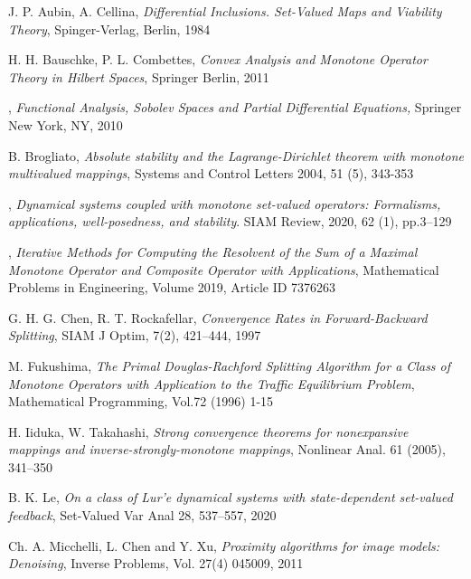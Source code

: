 \documentclass[11pt]{article}
\theoremstyle{plain}
\begin{document}
{\begin{thebibliography}{}
 {\sc J. P. Aubin, A. Cellina}, {\it Differential Inclusions. Set-Valued Maps and Viability Theory}, Spinger-Verlag, Berlin, 1984

   {\sc H. H. Bauschke, P. L. Combettes}, \textit{Convex Analysis and Monotone Operator
Theory in Hilbert Spaces}, Springer Berlin, 2011



, {\it Functional Analysis, Sobolev Spaces and Partial Differential Equations,} Springer New York, NY, 2010 

 { \sc B. Brogliato}, {\it Absolute stability and the Lagrange-Dirichlet theorem with monotone multivalued mappings}, Systems and Control Letters 2004, 51 (5), 343-353



, {\it Dynamical systems coupled with monotone set-valued operators: Formalisms, applications, well-posedness, and stability}. SIAM Review, 2020, 62 (1), pp.3--129

, {\it Iterative Methods for Computing the Resolvent of the Sum of a Maximal Monotone Operator and Composite Operator with Applications}, Mathematical Problems in Engineering, Volume 2019, Article ID 7376263


   {\sc G. H. G. Chen, R. T. Rockafellar}, \textit{Convergence Rates in Forward-Backward Splitting}, SIAM J Optim, 7(2), 421--444, 1997

   {\sc M. Fukushima}, \textit{The Primal Douglas-Rachford Splitting Algorithm for a Class of Monotone Operators
with Application to the Traffic Equilibrium Problem}, Mathematical Programming, Vol.72
(1996) 1-15



    {\sc H. Iiduka, W. Takahashi}, \textit{Strong convergence theorems for {nonexpansive}  mappings and
inverse-strongly-monotone mappings}, Nonlinear Anal. 61 (2005), 341--350



 {\sc B. K. Le}, {\it On a class of  Lur'e dynamical systems with state-dependent set-valued feedback}, Set-Valued Var  Anal 28, 537--557, 2020








 
     {\sc Ch. A. Micchelli, L. Chen and Y. Xu}, \textit{Proximity algorithms for image models: Denoising}, Inverse
Problems, Vol. 27(4) 045009, 2011


\end{thebibliography}}
\end{document}
